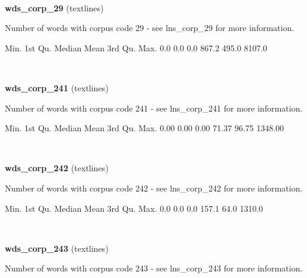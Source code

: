 \documentclass[]{article}
\newenvironment{Shaded}{\begin{snugshade}}{\end{snugshade}}
\newcommand{\FloatTok}[1]{\textcolor[rgb]{0.00,0.00,0.81}{{#1}}}
\newcommand{\NormalTok}[1]{{#1}}
\begin{document}
~

\vspace{1em}

\textbf{wds\_corp\_29} (textlines)

Number of words with corpus code 29 - see lns\_corp\_29 for more
information.

\begin{Shaded}
\begin{Highlighting}[]
   \NormalTok{Min. 1st Qu.  Median    Mean 3rd Qu.    Max. }
    \FloatTok{0.0}     \FloatTok{0.0}     \FloatTok{0.0}   \FloatTok{867.2}   \FloatTok{495.0}  \FloatTok{8107.0} 
\end{Highlighting}
\end{Shaded}

~

\vspace{1em}

\textbf{wds\_corp\_241} (textlines)

Number of words with corpus code 241 - see lns\_corp\_241 for more
information.

\begin{Shaded}
\begin{Highlighting}[]
   \NormalTok{Min. 1st Qu.  Median    Mean 3rd Qu.    Max. }
   \FloatTok{0.00}    \FloatTok{0.00}    \FloatTok{0.00}   \FloatTok{71.37}   \FloatTok{96.75} \FloatTok{1348.00} 
\end{Highlighting}
\end{Shaded}

~

\vspace{1em}

\textbf{wds\_corp\_242} (textlines)

Number of words with corpus code 242 - see lns\_corp\_242 for more
information.

\begin{Shaded}
\begin{Highlighting}[]
   \NormalTok{Min. 1st Qu.  Median    Mean 3rd Qu.    Max. }
    \FloatTok{0.0}     \FloatTok{0.0}     \FloatTok{0.0}   \FloatTok{157.1}    \FloatTok{64.0}  \FloatTok{1310.0} 
\end{Highlighting}
\end{Shaded}

~

\vspace{1em}

\textbf{wds\_corp\_243} (textlines)

Number of words with corpus code 243 - see lns\_corp\_243 for more
information.
\end{document}
